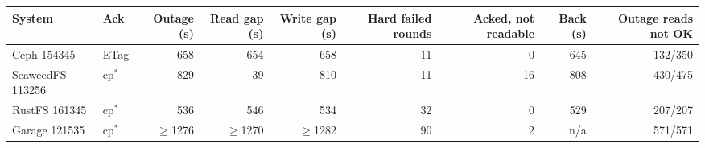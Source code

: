 \begin{tabular}{llrrrrrrr}
\toprule
System & Ack & Outage (s) & Read gap (s) & Write gap (s) & Hard failed rounds & Acked, not readable & Back (s) & Outage reads not OK \\
\midrule
Ceph 154345 & ETag & 658 & 654 & 658 & 11 & 0 & 645 & 132/350 \\
\midrule
SeaweedFS 113256 & cp$^{*}$ & 829 & 39 & 810 & 11 & 16 & 808 & 430/475 \\
\midrule
RustFS 161345 & cp$^{*}$ & 536 & 546 & 534 & 32 & 0 & 529 & 207/207 \\
\midrule
Garage 121535 & cp$^{*}$ & $\geq$1276 & $\geq$1270 & $\geq$1282 & 90 & 2 & n/a & 571/571 \\
\bottomrule
\end{tabular}
